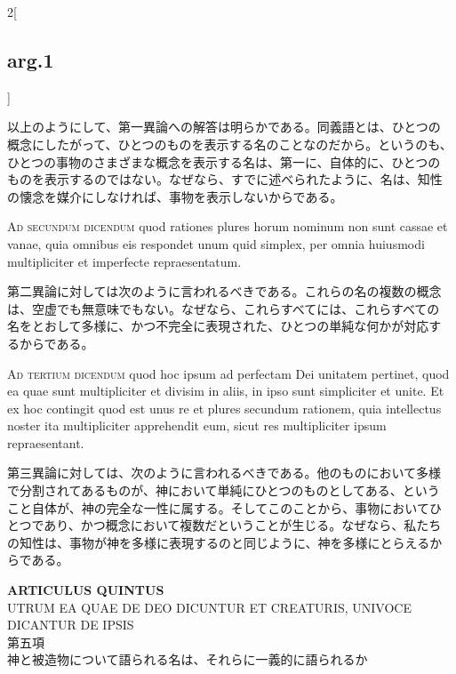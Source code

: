 \documentclass[paper=a4paper,fontsize=10pt,jafontsize=9pt,titlepage]{jlreq}
\begin{document}
\begin{paracol}{2}[\subsection{arg.1}]
\switchcolumn

以上のようにして、第一異論への解答は明らかである。同義語とは、ひとつの
概念にしたがって、ひとつのものを表示する名のことなのだから。というのも、
ひとつの事物のさまざまな概念を表示する名は、第一に、自体的に、ひとつの
ものを表示するのではない。なぜなら、すでに述べられたように、名は、知性
の懐念を媒介にしなければ、事物を表示しないからである。

\switchcolumn*[\subsection{ad.2}]

{\scshape Ad secundum dicendum} quod rationes plures horum nominum non sunt
cassae et vanae, quia omnibus eis respondet unum quid simplex, per
omnia huiusmodi multipliciter et imperfecte repraesentatum.

\switchcolumn

第二異論に対しては次のように言われるべきである。これらの名の複数の概念
は、空虚でも無意味でもない。なぜなら、これらすべてには、これらすべての
名をとおして多様に、かつ不完全に表現された、ひとつの単純な何かが対応す
るからである。

\switchcolumn*[\subsection{ad.3}]

{\scshape Ad tertium dicendum} quod hoc ipsum ad perfectam Dei unitatem
pertinet, quod ea quae sunt multipliciter et divisim in aliis, in ipso
sunt simpliciter et unite. Et ex hoc contingit quod est unus re et
plures secundum rationem, quia intellectus noster ita multipliciter
apprehendit eum, sicut res multipliciter ipsum repraesentant.

\switchcolumn

第三異論に対しては、次のように言われるべきである。他のものにおいて多様
で分割されてあるものが、神において単純にひとつのものとしてある、という
こと自体が、神の完全な一性に属する。そしてこのことから、事物においてひ
とつであり、かつ概念において複数だということが生じる。なぜなら、私たち
の知性は、事物が神を多様に表現するのと同じように、神を多様にとらえるか
らである。

\end{paracol}

\newpage
{}
\begin{center}
{\Large {\bfseries ARTICULUS QUINTUS}}\\
{UTRUM EA QUAE DE DEO DICUNTUR ET CREATURIS, UNIVOCE DICANTUR DE IPSIS}
\\{\large 第五項\\神と被造物について語られる名は、それらに一義的に語られるか}
\end{center}
\end{document}
